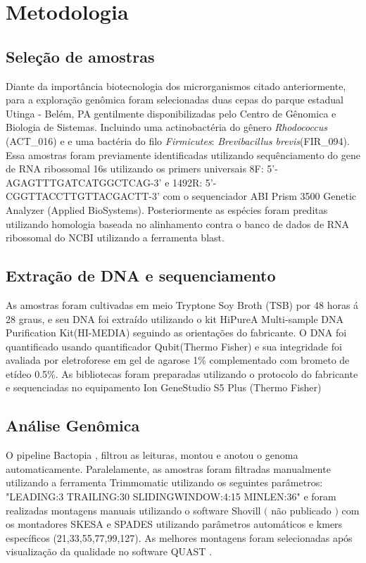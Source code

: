 \chapter{Metodologia}
\section{Seleção de amostras}

Diante da importância biotecnologia dos microrganismos citado anteriormente, 
para a exploração genômica foram selecionadas duas cepas do parque estadual Utinga - Belém, PA gentilmente disponibilizadas pelo Centro de Gênomica e Biologia de Sistemas.
Incluindo uma actinobactéria do gênero \textit{Rhodococcus} (ACT\_016) e e uma bactéria do filo \textit{Firmicutes}: \textit{Brevibacillus brevis}(FIR\_094).
Essa amostras foram previamente identificadas utilizando sequênciamento do gene de RNA ribossomal 16s
utilizando os primers universais 8F: 5'-AGAGTTTGATCATGGCTCAG-3' e 1492R: 5'-CGGTTACCTTGTTACGACTT-3' com o sequenciador 
ABI Prism 3500 Genetic Analyzer (Applied BioSystems). Posteriormente as espécies foram preditas utilizando
homologia baseada no alinhamento contra o banco de dados de RNA ribossomal do NCBI utilizando a ferramenta
blast.

\section{Extração de DNA e sequenciamento}
As amostras foram cultivadas em meio Tryptone Soy Broth (TSB) por 48 horas á 28 graus, e
seu DNA foi extraído utilizando o kit HiPureA Multi-sample DNA Purification Kit(HI-MEDIA) seguindo as orientações
do fabricante. O DNA foi quantificado usando quantificador Qubit(Thermo Fisher) e sua integridade foi 
avaliada por eletroforese em gel de agarose 1\% complementado com brometo de etídeo 0.5\%.
As bibliotecas foram preparadas utilizando o protocolo do fabricante e sequenciadas no equipamento
Ion GeneStudio S5 Plus (Thermo Fisher)

\section{Análise Genômica}
O pipeline Bactopia \cite{Bactopia}, filtrou as leituras, montou e anotou o genoma automaticamente.
Paralelamente, as amostras foram filtradas manualmente utilizando a ferramenta Trimmomatic \cite{bolger2014trimmomatic}
utilizando os seguintes parâmetros: "LEADING:3 TRAILING:30 SLIDINGWINDOW:4:15 MINLEN:36"
e foram realizadas montagens manuais utilizando o software Shovill $($ não publicado $)$ com os 
montadores SKESA\cite{souvorov2018skesa} e SPADES\cite{bankevich2012spades} utilizando
parâmetros automáticos e kmers específicos (21,33,55,77,99,127).
As melhores montagens foram selecionadas após visualização da qualidade no software QUAST \cite{gurevich2013quast}. 

